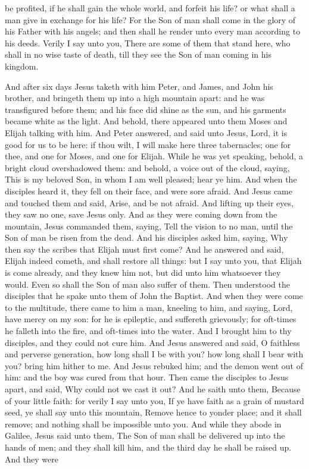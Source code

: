be profited, if he shall gain the whole world, and forfeit his life? or what shall a man give in exchange for his life? For the Son of man shall come in the glory of his Father with his angels; and then shall he render unto every man according to his deeds. Verily I say unto you, There are some of them that stand here, who shall in no wise taste of death, till they see the Son of man coming in his kingdom. 

And after six days Jesus taketh with him Peter, and James, and John his brother, and bringeth them up into a high mountain apart: and he was transfigured before them; and his face did shine as the sun, and his garments became white as the light. And behold, there appeared unto them Moses and Elijah talking with him. And Peter answered, and said unto Jesus, Lord, it is good for us to be here: if thou wilt, I will make here three tabernacles; one for thee, and one for Moses, and one for Elijah. While he was yet speaking, behold, a bright cloud overshadowed them: and behold, a voice out of the cloud, saying, This is my beloved Son, in whom I am well pleased; hear ye him. And when the disciples heard it, they fell on their face, and were sore afraid. And Jesus came and touched them and said, Arise, and be not afraid. And lifting up their eyes, they saw no one, save Jesus only.  And as they were coming down from the mountain, Jesus commanded them, saying, Tell the vision to no man, until the Son of man be risen from the dead. And his disciples asked him, saying, Why then say the scribes that Elijah must first come? And he answered and said, Elijah indeed cometh, and shall restore all things: but I say unto you, that Elijah is come already, and they knew him not, but did unto him whatsoever they would. Even so shall the Son of man also suffer of them. Then understood the disciples that he spake unto them of John the Baptist.  And when they were come to the multitude, there came to him a man, kneeling to him, and saying, Lord, have mercy on my son: for he is epileptic, and suffereth grievously; for oft-times he falleth into the fire, and oft-times into the water. And I brought him to thy disciples, and they could not cure him. And Jesus answered and said, O faithless and perverse generation, how long shall I be with you? how long shall I bear with you? bring him hither to me. And Jesus rebuked him; and the demon went out of him: and the boy was cured from that hour.  Then came the disciples to Jesus apart, and said, Why could not we cast it out? And he saith unto them, Because of your little faith: for verily I say unto you, If ye have faith as a grain of mustard seed, ye shall say unto this mountain, Remove hence to yonder place; and it shall remove; and nothing shall be impossible unto you.   And while they abode in Galilee, Jesus said unto them, The Son of man shall be delivered up into the hands of men; and they shall kill him, and the third day he shall be raised up. And they were 